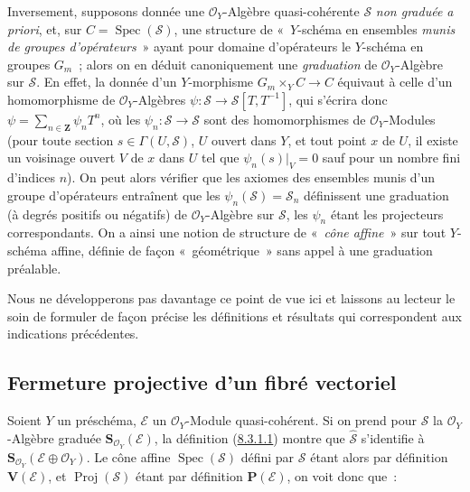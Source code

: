 \begin{remark}[8.3.9]
Inversement, supposons donnée une $\mathcal{O}_Y$-Algèbre quasi-cohérente
$\mathcal{S}$ \emph{non graduée a priori}, et, sur
$C=\operatorname{Spec}(\mathcal{S})$, une structure de «~$Y$-schéma en
ensembles \emph{munis de groupes d'opérateurs}~» ayant pour domaine
d'opérateurs le $Y$-schéma en groupes $G_m$~; alors on en déduit
canoniquement une \emph{graduation} de $\mathcal{O}_Y$-Algèbre sur
$\mathcal{S}$. En effet, la donnée d'un $Y$-morphisme $G_m\times_YC\to C$
équivaut à celle d'un homomorphisme de $\mathcal{O}_Y$-Algèbres
$\psi:\mathcal{S}\to\mathcal{S}[T,T^{-1}]$, qui s'écrira donc
$\psi=\sum_{n\in\mathbf{Z}}\psi_nT^n$, où les
$\psi_n:\mathcal{S}\to\mathcal{S}$ sont des homomorphismes de
$\mathcal{O}_Y$-Modules (pour toute section $s\in\Gamma(U,\mathcal{S})$, $U$ ouvert dans $Y$,
et tout point $x$ de $U$, il existe un voisinage ouvert $V$ de $x$ dans $U$
tel que $\psi_n(s)|_V=0$ sauf pour un nombre fini d'indices $n$). On peut
alors vérifier que les axiomes des ensembles munis d'un groupe d'opérateurs
entraînent que les $\psi_n(\mathcal{S})=\mathcal{S}_n$ définissent une
graduation (à degrés positifs ou négatifs) de $\mathcal{O}_Y$-Algèbre sur
$\mathcal{S}$, les $\psi_n$ étant les projecteurs correspondants. On a ainsi
une notion de structure de «~\emph{cône affine}~» sur tout $Y$-schéma affine,
définie de façon «~géométrique~» sans appel à une graduation préalable.

Nous ne développerons pas davantage ce point de vue ici et laissons au
lecteur le soin de formuler de façon précise les définitions et résultats qui
correspondent aux indications précédentes.
\end{remark}

\subsection{Fermeture projective d'un fibré vectoriel}
\label{subsection:II.8.4-fr}

\begin{env}[8.4.1]
\label{II.8.4.1-fr}
Soient $Y$ un préschéma, $\mathcal{E}$ un $\mathcal{O}_Y$-Module
quasi-cohérent. Si on prend pour $\mathcal{S}$ la $\mathcal{O}_Y$-Algèbre
graduée $\mathbf{S}_{\mathcal{O}_Y}(\mathcal{E})$, la définition
(\hyperref[II.8.3.1.1-fr]{8.3.1.1}) montre que
$\widehat{\mathcal{S}}$ s'identifie à
$\mathbf{S}_{\mathcal{O}_Y}(\mathcal{E}\oplus\mathcal{O}_Y)$. Le cône affine
$\operatorname{Spec}(\mathcal{S})$ défini par $\mathcal{S}$ étant alors par
définition $\mathbf{V}(\mathcal{E})$, et $\operatorname{Proj}(\mathcal{S})$
étant par définition $\mathbf{P}(\mathcal{E})$, on voit donc que~:
\end{env}

